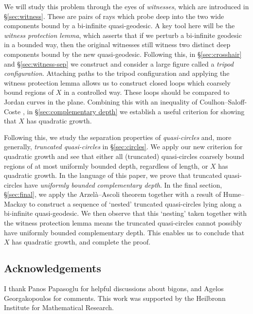 \documentclass[11pt,a4paper]{amsart}
\theoremstyle{definition}
\begin{document}
We will study this problem through the eyes of \emph{witnesses}, which are introduced in \S\ref{sec:witness}. These are pairs of rays which probe deep into the two wide components bound by a bi-infinite quasi-geodesic. A key tool here will be the \emph{witness protection lemma}, which asserts that if we perturb a bi-infinite geodesic in a bounded way, then the original witnesses still witness two distinct deep components bound by the new quasi-geodesic. Following this, in \S\ref{sec:crosshair} and \S\ref{sec:witness-sep} we construct and consider a large figure called a \emph{tripod configuration}. Attaching paths to the tripod configuration and applying the witness protection lemma allows us to construct closed loops which coarsely bound regions of $X$ in a controlled way. These loops should be compared to Jordan curves in the plane. Combining this with an inequality of Coulhon--Saloff-Coste \cite{CoulhonSaloffCoste1993,saloff1995isoperimetric}, 
in \S\ref{sec:complementary depth} we establish a useful criterion for showing that $X$ has quadratic growth. 

Following this, we study the separation properties of \emph{quasi-circles} and, more generally, \emph{truncated quasi-circles} in \S\ref{sec:circles}. We apply our new criterion for quadratic growth and see that either  all (truncated) quasi-circles coarsely bound regions of at most uniformly bounded depth, regardless of length, or $X$ has quadratic growth. In the language of this paper, we prove that truncated quasi-circles have \emph{uniformly bounded complementary depth}. In the final section, \S\ref{sec:final}, we apply the Arzel\`a--Ascoli theorem together with a result of Hume--Mackay \cite{hume2020poorly} to construct a sequence of `nested' truncated quasi-circles lying along a bi-infinite quasi-geodesic. We then observe that this `nesting' taken together with the witness protection lemma means the truncated quasi-circles cannot possibly have uniformly bounded complementary depth. This enables us to conclude that $X$ has quadratic growth, and complete the proof.


\subsection*{Acknowledgements}

 I thank Panos Papasoglu for helpful discussions about bigons, and Agelos Georgakopoulos for comments. This work was supported by the Heilbronn Institute for Mathematical Research.

\end{document}
